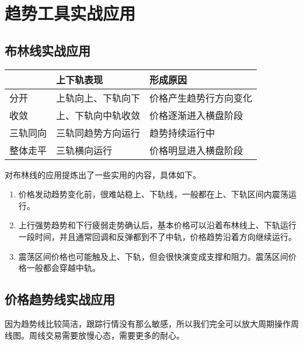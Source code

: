 \section{趋势工具实战应用}

\subsection{布林线实战应用}
\begin{table}
    \centering
    \begin{tabular}{lll}
        \hline
             & 上下轨表现     & 形成原因        \\
        \hline
        分开   & 上轨向上、下轨向下 & 价格产生趋势行方向变化 \\
        收敛   & 上、下轨向中轨收敛 & 价格逐渐进入横盘阶段  \\
        三轨同向 & 三轨同趋势方向运行 & 趋势持续运行中     \\
        整体走平 & 三轨横向运行    & 价格明显进入横盘阶段  \\
        \hline
    \end{tabular}
\end{table}

对布林线的应用提炼出了一些实用的内容，具体如下。

\begin{enumerate}
    \item 价格发动趋势变化前，很难站稳上、下轨线，一般都在上、下轨区间内震荡运行。
    \item 上行强势趋势和下行疲弱走势确认后，基本价格可以沿着布林线上、下轨运行一段时间，并且通常回调和反弹都到不了中轨，价格趋势沿着方向继续运行。
    \item 震荡区间价格也可能触及上、下轨，但会很快演变成支撑和阻力。震荡区间价格一般都会穿越中轨。
\end{enumerate}
\subsection{价格趋势线实战应用}

因为趋势线比较简洁，跟踪行情没有那么敏感，所以我们完全可以放大周期操作周线图。周线交易需要放慢心态，需要更多的耐心。